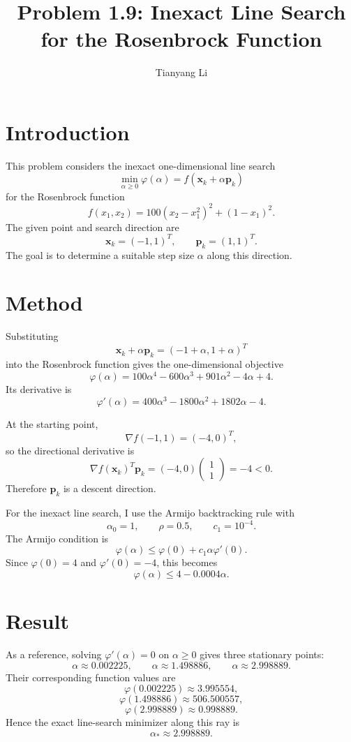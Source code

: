 \documentclass{article}
\title{Problem 1.9: Inexact Line Search for the Rosenbrock Function}
\author{Tianyang Li}
\begin{document}
\maketitle

\section{Introduction}

This problem considers the inexact one-dimensional line search
\[
    \min_{\alpha \ge 0} \varphi(\alpha) = f(\bm{x}_k + \alpha \bm{p}_k)
\]
for the Rosenbrock function
\[
    f(x_1, x_2) = 100(x_2 - x_1^2)^2 + (1 - x_1)^2.
\]
The given point and search direction are
\[
    \bm{x}_k = (-1, 1)^T, \qquad \bm{p}_k = (1, 1)^T.
\]
The goal is to determine a suitable step size $\alpha$ along this direction.

\section{Method}

Substituting
\[
    \bm{x}_k + \alpha \bm{p}_k = (-1 + \alpha, 1 + \alpha)^T
\]
into the Rosenbrock function gives the one-dimensional objective
\[
    \varphi(\alpha) = 100\alpha^4 - 600\alpha^3 + 901\alpha^2 - 4\alpha + 4.
\]
Its derivative is
\[
    \varphi'(\alpha) = 400\alpha^3 - 1800\alpha^2 + 1802\alpha - 4.
\]

At the starting point,
\[
    \nabla f(-1, 1) = (-4, 0)^T,
\]
so the directional derivative is
\[
    \nabla f(\bm{x}_k)^T \bm{p}_k = (-4, 0)
    \begin{pmatrix}
        1 \\
        1
    \end{pmatrix}
    = -4 < 0.
\]
Therefore $\bm{p}_k$ is a descent direction.

For the inexact line search, I use the Armijo backtracking rule with
\[
    \alpha_0 = 1, \qquad \rho = 0.5, \qquad c_1 = 10^{-4}.
\]
The Armijo condition is
\[
    \varphi(\alpha) \le \varphi(0) + c_1 \alpha \varphi'(0).
\]
Since $\varphi(0) = 4$ and $\varphi'(0) = -4$, this becomes
\[
    \varphi(\alpha) \le 4 - 0.0004\alpha.
\]

\section{Result}

As a reference, solving $\varphi'(\alpha) = 0$ on $\alpha \ge 0$ gives three stationary points:
\[
    \alpha \approx 0.002225, \qquad \alpha \approx 1.498886, \qquad \alpha \approx 2.998889.
\]
Their corresponding function values are
\[
    \varphi(0.002225) \approx 3.995554,
\]
\[
    \varphi(1.498886) \approx 506.500557,
\]
\[
    \varphi(2.998889) \approx 0.998889.
\]
Hence the exact line-search minimizer along this ray is
\[
    \alpha_* \approx 2.998889.
\]
\end{document}
